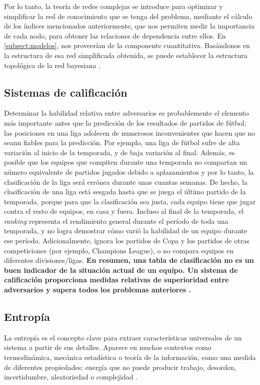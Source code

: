 Por lo tanto, la teoría de redes complejas se introduce para optimizar y simplificar la red de conocimiento que 
se tenga del problema, mediante el cálculo de los índices mencionados anteriormente, que nos permiten medir 
la importancia de cada nodo, para obtener las relaciones de dependencia entre ellos. En \ref{subsect:modelos}, 
nos proveerían de la componente cuantitativa. Basándonos en la 
estructura de esa red simplificada obtenida, se puede establecer la estructura topológica de la red 
bayesiana \cite{Bai_Xing_Wu_2022}.

\subsection{Sistemas de calificación} \label{subsect:ratings}
Determinar la habilidad relativa entre adversarios es probablemente el
elemento más importante antes que la predicción de los resultados de partidos de fútbol; las posiciones en 
una liga adolecen de numerosos inconvenientes que hacen que no seann fiables para la predicción. 
Por ejemplo, una liga de fútbol sufre de alta variación al inicio de la temporada, y de baja 
variación al final. Además, es posible que los equipos que compiten durante una temporada no
compartan un número equivalente de partidos jugados debido a aplazamientos y
por lo tanto, la clasificación de la liga será errónea durante unas cuantas semanas. De hecho, la clasificación de 
una liga está sesgada hasta que se juega el último partido de la temporada, porque
para que la clasificación sea justa, cada equipo tiene que jugar contra el resto de equipos, en
casa y fuera. Incluso al final de la temporada, el \textit{ranking} representa
el rendimiento general durante el período de toda una temporada, y no logra
demostrar cómo varió la habilidad de un equipo durante ese período. Adicionalmente,
ignora los partidos de Copa y los partidos de otras competiciones (por ejemplo, Champions
League), o no compara equipos en diferentes divisiones/ligas. \textbf{En
resumen, una tabla de clasificación no es un buen indicador de la situación actual de un equipo. Un 
sistema de calificación proporciona medidas relativas de superioridad entre adversarios y supera 
todos los problemas anteriores \cite{pi-ratings}.}

\subsection{Entropía}
La entropía es el concepto clave para extraer características universales de un sistema a partir de sus 
detalles. Aparece en muchos contextos como termodinámica, mecánica estadística o teoría de la información, como 
una medida de diferentes propiedades: energía que no puede producir trabajo, desorden, incertidumbre, 
aleatoriedad o complejidad \cite{gen-entr-review}.

